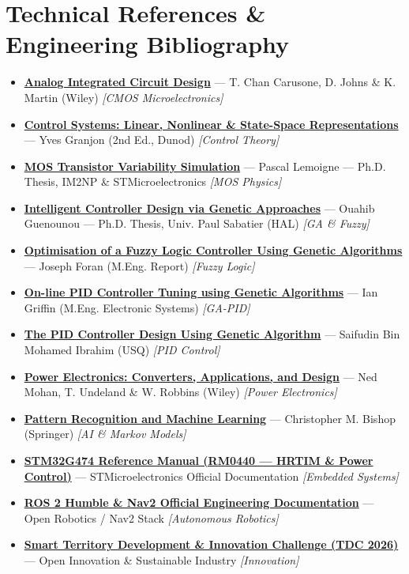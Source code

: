 \documentclass[10pt,a4paper]{article}
\begin{document}
\section*{Technical References \& Engineering Bibliography}
\begin{itemize}
\item \href{https://www.wiley.com/en-us/Analog+Integrated+Circuit+Design\%2C+2nd+Edition-p-9780470770108}{\textbf{Analog Integrated Circuit Design}} --- T. Chan Carusone, D. Johns \& K. Martin (Wiley) \textit{[CMOS Microelectronics]}
\item \href{https://www.dunod.com/}{\textbf{Control Systems: Linear, Nonlinear \& State-Space Representations}} --- Yves Granjon (2nd Ed., Dunod) \textit{[Control Theory]}
\item \href{https://www.im2np.fr/}{\textbf{MOS Transistor Variability Simulation}} --- Pascal Lemoigne --- Ph.D. Thesis, IM2NP \& STMicroelectronics \textit{[MOS Physics]}
\item \href{https://theses.hal.science/tel-00392473v1}{\textbf{Intelligent Controller Design via Genetic Approaches}} --- Ouahib Guenounou --- Ph.D. Thesis, Univ. Paul Sabatier (HAL) \textit{[GA \& Fuzzy]}
\item \href{https://www.mathworks.com/products/fuzzy-logic.html}{\textbf{Optimisation of a Fuzzy Logic Controller Using Genetic Algorithms}} --- Joseph Foran (M.Eng. Report) \textit{[Fuzzy Logic]}
\item \href{https://www.mathworks.com/discovery/genetic-algorithm.html}{\textbf{On-line PID Controller Tuning using Genetic Algorithms}} --- Ian Griffin (M.Eng. Electronic Systems) \textit{[GA-PID]}
\item \href{https://www.mathworks.com/discovery/pid-control.html}{\textbf{The PID Controller Design Using Genetic Algorithm}} --- Saifudin Bin Mohamed Ibrahim (USQ) \textit{[PID Control]}
\item \href{https://www.wiley.com/}{\textbf{Power Electronics: Converters, Applications, and Design}} --- Ned Mohan, T. Undeland \& W. Robbins (Wiley) \textit{[Power Electronics]}
\item \href{https://www.microsoft.com/en-us/research/publication/pattern-recognition-machine-learning/}{\textbf{Pattern Recognition and Machine Learning}} --- Christopher M. Bishop (Springer) \textit{[AI \& Markov Models]}
\item \href{https://www.st.com/resource/en/reference_manual/rm0440-stm32g4-series-advanced-armbased-32bit-mcus-stmicroelectronics.pdf}{\textbf{STM32G474 Reference Manual (RM0440 --- HRTIM \& Power Control)}} --- STMicroelectronics Official Documentation \textit{[Embedded Systems]}
\item \href{https://navigation.ros.org/}{\textbf{ROS 2 Humble \& Nav2 Official Engineering Documentation}} --- Open Robotics / Nav2 Stack \textit{[Autonomous Robotics]}
\item \href{https://ensat.ac.ma/Portail/}{\textbf{Smart Territory Development \& Innovation Challenge (TDC 2026)}} --- Open Innovation \& Sustainable Industry \textit{[Innovation]}
\end{itemize}
\end{document}
